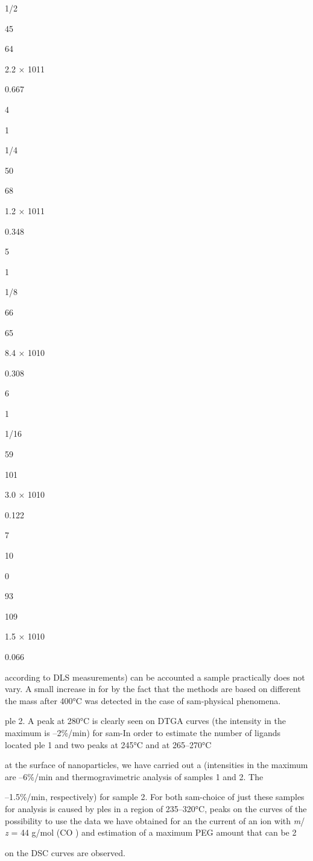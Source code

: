 \documentclass[12pt,a4paper]{article}
\begin{document}
1/2

45

64

2.2 × 1011

0.667

4

1

1/4

50

68

1.2 × 1011

0.348

5

1

1/8

66

65

8.4 × 1010

0.308

6

1

1/16

59

101

3.0 × 1010

0.122

7

10

0

93

109

1.5 × 1010

0.066

according to DLS measurements) can be accounted a sample practically
does not vary. A small increase in for by the fact that the methods are
based on different the mass after 400°C was detected in the case of
sam-physical phenomena.

ple 2. A peak at 280°C is clearly seen on DTGA curves (the intensity in
the maximum is --2\%/min) for sam-In order to estimate the number of
ligands located ple 1 and two peaks at 245°C and at 265--270°C

at the surface of nanoparticles, we have carried out a (intensities in
the maximum are --6\%/min and thermogravimetric analysis of samples 1
and 2. The

--1.5\%/min, respectively) for sample 2. For both sam-choice of just
these samples for analysis is caused by ples in a region of 235--320°C,
peaks on the curves of the possibility to use the data we have obtained
for an the current of an ion with \emph{m}/ \emph{z} = 44 g/mol (CO )
and estimation of a maximum PEG amount that can be 2

on the DSC curves are observed.
\end{document}
